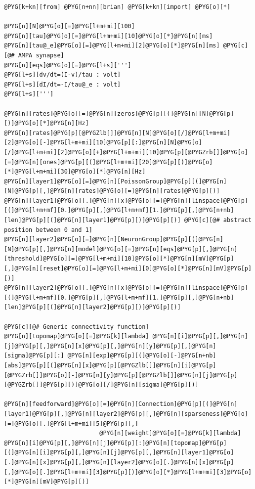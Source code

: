 \documentclass[letterpaper,10pt,english]{manual}
\begin{document}
\begin{Verbatim}[commandchars=@\[\]]
@PYG[k+kn][from] @PYG[n+nn][brian] @PYG[k+kn][import] @PYG[o][*]

@PYG[n][N]@PYG[o][=]@PYG[l+m+mi][100]
@PYG[n][tau]@PYG[o][=]@PYG[l+m+mi][10]@PYG[o][*]@PYG[n][ms]
@PYG[n][tau@_e]@PYG[o][=]@PYG[l+m+mi][2]@PYG[o][*]@PYG[n][ms] @PYG[c][@# AMPA synapse]
@PYG[n][eqs]@PYG[o][=]@PYG[l+s][''']
@PYG[l+s][dv/dt=(I-v)/tau : volt]
@PYG[l+s][dI/dt=-I/tau@_e : volt]
@PYG[l+s][''']

@PYG[n][rates]@PYG[o][=]@PYG[n][zeros]@PYG[p][(]@PYG[n][N]@PYG[p][)]@PYG[o][*]@PYG[n][Hz]
@PYG[n][rates]@PYG[p][@PYGZlb[]]@PYG[n][N]@PYG[o][/]@PYG[l+m+mi][2]@PYG[o][-]@PYG[l+m+mi][10]@PYG[p][:]@PYG[n][N]@PYG[o][/]@PYG[l+m+mi][2]@PYG[o][+]@PYG[l+m+mi][10]@PYG[p][@PYGZrb[]]@PYG[o][=]@PYG[n][ones]@PYG[p][(]@PYG[l+m+mi][20]@PYG[p][)]@PYG[o][*]@PYG[l+m+mi][30]@PYG[o][*]@PYG[n][Hz]
@PYG[n][layer1]@PYG[o][=]@PYG[n][PoissonGroup]@PYG[p][(]@PYG[n][N]@PYG[p][,]@PYG[n][rates]@PYG[o][=]@PYG[n][rates]@PYG[p][)]
@PYG[n][layer1]@PYG[o][.]@PYG[n][x]@PYG[o][=]@PYG[n][linspace]@PYG[p][(]@PYG[l+m+mf][0.]@PYG[p][,]@PYG[l+m+mf][1.]@PYG[p][,]@PYG[n+nb][len]@PYG[p][(]@PYG[n][layer1]@PYG[p][)]@PYG[p][)] @PYG[c][@# abstract position between 0 and 1]
@PYG[n][layer2]@PYG[o][=]@PYG[n][NeuronGroup]@PYG[p][(]@PYG[n][N]@PYG[p][,]@PYG[n][model]@PYG[o][=]@PYG[n][eqs]@PYG[p][,]@PYG[n][threshold]@PYG[o][=]@PYG[l+m+mi][10]@PYG[o][*]@PYG[n][mV]@PYG[p][,]@PYG[n][reset]@PYG[o][=]@PYG[l+m+mi][0]@PYG[o][*]@PYG[n][mV]@PYG[p][)]
@PYG[n][layer2]@PYG[o][.]@PYG[n][x]@PYG[o][=]@PYG[n][linspace]@PYG[p][(]@PYG[l+m+mf][0.]@PYG[p][,]@PYG[l+m+mf][1.]@PYG[p][,]@PYG[n+nb][len]@PYG[p][(]@PYG[n][layer2]@PYG[p][)]@PYG[p][)]

@PYG[c][@# Generic connectivity function]
@PYG[n][topomap]@PYG[o][=]@PYG[k][lambda] @PYG[n][i]@PYG[p][,]@PYG[n][j]@PYG[p][,]@PYG[n][x]@PYG[p][,]@PYG[n][y]@PYG[p][,]@PYG[n][sigma]@PYG[p][:] @PYG[n][exp]@PYG[p][(]@PYG[o][-]@PYG[n+nb][abs]@PYG[p][(]@PYG[n][x]@PYG[p][@PYGZlb[]]@PYG[n][i]@PYG[p][@PYGZrb[]]@PYG[o][-]@PYG[n][y]@PYG[p][@PYGZlb[]]@PYG[n][j]@PYG[p][@PYGZrb[]]@PYG[p][)]@PYG[o][/]@PYG[n][sigma]@PYG[p][)]

@PYG[n][feedforward]@PYG[o][=]@PYG[n][Connection]@PYG[p][(]@PYG[n][layer1]@PYG[p][,]@PYG[n][layer2]@PYG[p][,]@PYG[n][sparseness]@PYG[o][=]@PYG[o][.]@PYG[l+m+mi][5]@PYG[p][,]
                           @PYG[n][weight]@PYG[o][=]@PYG[k][lambda] @PYG[n][i]@PYG[p][,]@PYG[n][j]@PYG[p][:]@PYG[n][topomap]@PYG[p][(]@PYG[n][i]@PYG[p][,]@PYG[n][j]@PYG[p][,]@PYG[n][layer1]@PYG[o][.]@PYG[n][x]@PYG[p][,]@PYG[n][layer2]@PYG[o][.]@PYG[n][x]@PYG[p][,]@PYG[o][.]@PYG[l+m+mi][3]@PYG[p][)]@PYG[o][*]@PYG[l+m+mi][3]@PYG[o][*]@PYG[n][mV]@PYG[p][)]


\end{Verbatim}
\end{document}
